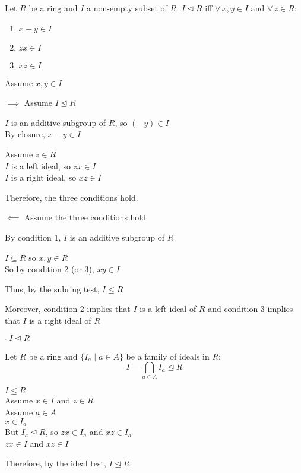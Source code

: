 \documentclass[letterpaper,12pt,fleqn]{article}
\newcommand{\ide}{\trianglelefteq}
\begin{document}
\begin{theorem}
  Let $R$ be a ring and $I$ a non-empty subset of $R$. $I\ide R$ iff
  $\forall\,x,y\in I$ and $\forall\,z\in R$:
  \begin{enumerate}
  \item $x-y\in I$
  \item $zx\in I$
  \item $xz\in I$
  \end{enumerate}
\end{theorem}
\newpage
\begin{theproof}
  Assume $x,y\in I$

  \begin{description}
  \item $\implies$ Assume $I\ide R$

    $I$ is an additive subgroup of $R$, so $(-y)\in I$ \\
    By closure, $x-y\in I$

    Assume $z\in R$ \\
    $I$ is a left ideal, so $zx\in I$ \\
    $I$ is a right ideal, so $xz\in I$

    Therefore, the three conditions hold.

  \item $\impliedby$ Assume the three conditions hold

    By condition 1, $I$ is an additive subgroup of $R$
    
    $I\subseteq R$ so $x,y\in R$ \\
    So by condition 2 (or 3), $xy\in I$
    
    Thus, by the subring test, $I\le R$

    Moreover, condition 2 implies that $I$ is a left ideal of $R$ and condition 3
    implies that $I$ is a right ideal of $R$

    $\therefore I\ide R$
  \end{description}
\end{theproof}

\begin{theorem}
  Let $R$ be a ring and $\{I_a\mid a\in A\}$ be a family of ideals in $R$:
  \[I=\bigcap_{a\in A}I_a\ide R\]
\end{theorem}

\begin{theproof}
  $I\le R$ \\
  Assume $x\in I$ and $z\in R$ \\
  Assume $a\in A$ \\
  $x\in I_a$ \\
  But $I_a\ide R$, so $zx\in I_a$ and $xz\in I_a$ \\
  $zx\in I$ and $xz\in I$

  Therefore, by the ideal test, $I\ide R$.
\end{theproof}
\end{document}
